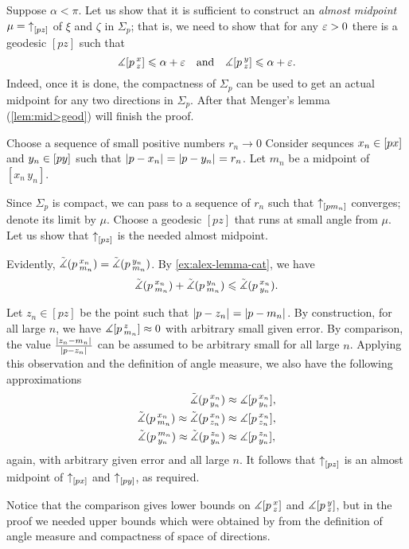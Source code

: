 Suppose $\alpha<\pi$.
Let us show that it is sufficient to construct an \emph{almost midpoint} $\mu\z=\dir pz$ of $\xi$ and $\zeta$ in $\Sigma_p$;
that is, we need to show that for any $\varepsilon>0$ there is a geodesic $[pz]$ such that
\[\measuredangle[p\,{}^{x}_{z}]\leqslant \alpha+\varepsilon
\quad\text{and}\quad
\measuredangle[p\,{}^{y}_{z}]\leqslant \alpha+\varepsilon.\]
Indeed, once it is done, the compactness of $\Sigma_p$ can be used to get an actual midpoint for any two directions in $\Sigma_p$.
After that Menger's lemma (\ref{lem:mid>geod}) will finish the proof.

Choose a sequence of small positive numbers $r_n\to0$
Consider sequnces $x_n\z\in [px]$ and $y_n\z\in [py]$ such that $\dist{p}{x_n}{}=\dist{p}{y_n}{}=r_n$.
Let $m_n$ be a midpoint of $[x_n\,y_n]$.

Since $\Sigma_p$ is compact, we can pass to a sequence of $r_n$ such that 
${\uparrow}_{[{p}{m_n}]}$ converges;
denote its limit by $\mu$.
Choose a geodesic $[pz]$ that runs at small angle from $\mu$.
Let us show that ${\uparrow}_{[{p}{z}]}$ is the needed almost midpoint.

Evidently, $\tilde\measuredangle(p\,{}^{x_n}_{m_n})=\tilde\measuredangle(p\,{}^{y_n}_{m_n})$.
By \ref{ex:alex-lemma-cat}, we have
\[\tilde\measuredangle(p\,{}^{x_n}_{m_n})+\tilde\measuredangle(p\,{}^{y_n}_{m_n})\leqslant \tilde\measuredangle(p\,{}^{x_n}_{y_n}).\]

Let $z_n\in [pz]$ be the point such that $\dist{p}{z_n}{}=\dist{p}{m_n}{}$.
By construction, for all large $n$, we have $\measuredangle[p\,{}^{z}_{m_n}]\approx0$  with arbitrary small given error.
By comparison, the value $\frac{\dist{z_n}{m_n}{}}{\dist{p}{z_n}{}}$ can be assumed to be arbitrary small for all large $n$.
Applying this observation and the definition of angle measure, we also have the following approximations
\begin{align*}
\tilde\measuredangle(p\,{}^{x_n}_{y_n})&\approx \measuredangle[p\,{}^{x_n}_{y_n}],
\\
\tilde\measuredangle(p\,{}^{x_n}_{m_n})\approx\tilde\measuredangle(p\,{}^{x_n}_{z_n})&\approx\measuredangle[p\,{}^{x_n}_{z_n}],
\\
\tilde\measuredangle(p\,{}^{m_n}_{y_n})\approx\tilde\measuredangle(p\,{}^{z_n}_{y_n})&\approx\measuredangle[p\,{}^{z_n}_{y_n}],
\end{align*}
again, with arbitrary given error and all large $n$.
It follows that ${\uparrow}_{[{p}{z}]}$ is an almost midpoint of ${\uparrow}_{[{p}{x}]}$ and ${\uparrow}_{[{p}{y}]}$, as required.
\qeds

Notice that the comparison gives lower bounds on $\measuredangle[p\,{}^{x}_{z}]$ and $\measuredangle[p\,{}^{y}_{z}]$, but in the proof we needed upper bounds which were obtained by from the definition of angle measure and compactness of space of directions.

